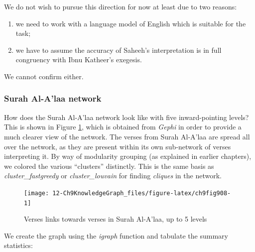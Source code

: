 \documentclass[
]{article}
\providecommand{\tightlist}{%
  \setlength{\itemsep}{0pt}\setlength{\parskip}{0pt}}
\begin{document}
We do not wish to pursue this direction for now at least due to two reasons:

\begin{enumerate}
\def\labelenumi{\alph{enumi})}
\tightlist
\item
  we need to work with a language model of English which is suitable for the task;
\item
  we have to assume the accuracy of Saheeh's interpretation is in full congruency with Ibnu Katheer's exegesis.
\end{enumerate}

We cannot confirm either.

\hypertarget{surah-al-alaa-network}{%
\subsubsection{Surah Al-A'laa network}\label{surah-al-alaa-network}}

How does the Surah Al-A'laa network look like with five inward-pointing levels? This is shown in Figure \ref{fig:ch9fig908}, which is obtained from \emph{Gephi} in order to provide a much clearer view of the network. The verses from Surah Al-A'laa are spread all over the network, as they are present within its own sub-network of verses interpreting it. By way of modularity grouping (as explained in earlier chapters), we colored the various ``clusters'' distinctly. This is the same basis as \emph{cluster\_fastgreedy} or \emph{cluster\_louvain} for finding \emph{cliques} in the network.

\begin{figure}

{\centering \texttt{[image: 12-Ch9KnowledgeGraph\_files/figure-latex/ch9fig908-1]} 

}

\caption{Verses links towards verses in Surah Al-A'laa, up to 5 levels}\label{fig:ch9fig908}
\end{figure}

We create the graph using the \emph{igraph} function and tabulate the summary statistics:

\footnotesize
\end{document}
